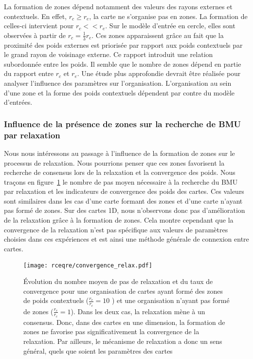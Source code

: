 \documentclass[../main]{subfiles}
\begin{document}
La formation de zones dépend notamment des valeurs des rayons externes et contextuels. 
En effet, $r_c \geq r_e$, la carte ne s'organise pas en zones. La formation de celles-ci intervient pour $r_c << r_e$. Sur le modèle d'entrée en cercle, elles sont observées à partir de $r_c = \frac{1}{3} r_e$.
Ces zones apparaissent grâce au fait que la proximité des poids externes est priorisée par rapport aux poids contextuels par le grand rayon de voisinage externe. 
Ce rapport introduit une relation subordonnée entre les poids. 
Il semble que le nombre de zones dépend en partie du rapport entre $r_c$ et $r_e$. Une étude plus approfondie devrait être réalisée pour analyser l'influence des paramètres sur l'organisation. 
L'organisation au sein d'une zone et la forme des poids contextuels dépendent par contre du modèle d'entrées.

\subsubsection{Influence de la présence de zones sur la recherche de BMU par relaxation}

Nous nous intéressons au passage à l'influence de la formation de zones sur le processus de relaxation.
Nous pourrions penser que ces zones favorisent la recherche de consensus lors de la relaxation et la convergence des poids.
Nous traçons en figure~\ref{fig:conv_rcre} le nombre de pas moyen nécessaire à la recherche du BMU par relaxation et les indicateurs de convergence des poids des cartes.
Ces valeurs sont similaires dans les cas d'une carte formant des zones et d'une carte n'ayant pas formé de zones. Sur des cartes 1D, nous n'observons donc pas d'amélioration de la relaxation grâce à la formation de zones.
Cela montre cependant que la convergence de la relaxation n'est pas spécifique aux valeurs de paramètres choisies dans ces expériences et est ainsi une méthode générale de connexion entre cartes.


\begin{figure}[h!]
	\texttt{[image: rceqre/convergence\_relax.pdf]}
	\caption{\'Evolution du nombre moyen de pas de relaxation et du taux de convergence pour une organisation de cartes ayant formé des zones de poids contextuels ($\frac{r_e}{r_c} = 10$ ) et une organisation n'ayant pas formé de zones ($\frac{r_e}{r_c} = 1$). Dans les deux cas, la relaxation mène à un consensus. 
	Donc, dans des cartes en une dimension, la formation de zones ne favorise pas significativement la convergence de la relaxation. Par ailleurs, le mécanisme de relaxation a donc un sens général, quels que soient les paramètres des cartes \label{fig:conv_rcre}}
\end{figure}
\end{document}
